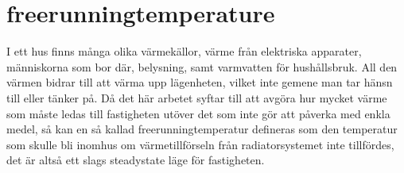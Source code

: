 \section*{freerunningtemperature}
I ett hus finns många olika värmekällor, värme från elektriska apparater, människorna som bor där, belysning, samt varmvatten för hushållsbruk. All den värmen bidrar till att värma upp lägenheten, vilket inte gemene man tar hänsn till eller tänker på. Då det här arbetet syftar till att avgöra hur mycket värme som måste ledas till fastigheten utöver det som inte gör att påverka med enkla medel, så kan en så kallad freerunningtemperatur defineras som den temperatur som skulle bli inomhus om värmetillförseln från radiatorsystemet inte tillfördes, det är altså ett slags steadystate läge för fastigheten.